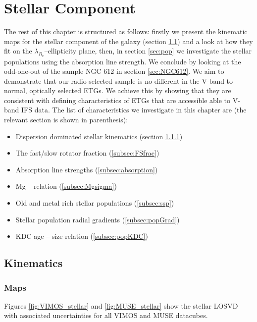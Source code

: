 \chapter{Stellar Component}
	\label{cha:stellar}


The rest of this chapter is structured as follows: firstly we present the kinematic maps for the stellar component of the galaxy (section \ref{sec:stellarKin}) and a look at how they fit on the $\lambda_{R_e}$--ellipticity plane, then, in section \ref{sec:pop} we investigate the stellar populations using the absorption line strength. We conclude by looking at the odd-one-out of the sample NGC 612 in section \ref{sec:NGC612}. We aim to demonstrate that our radio selected sample is no different in the V-band to normal, optically selected ETGs. We achieve this by showing that they are consistent with defining characteristics of ETGs that are accessible able to V-band IFS data. The list of characteristics we investigate in this chapter are (the relevant section is shown in parenthesis):
\begin{itemize}
	\item Dispersion dominated stellar kinematics (section \ref{subsec:maps})
	\item The fast/slow rotator fraction (\ref{subsec:FSfrac})
	\item Absorption line strengths (\ref{subsec:absorption})
	\item Mg -- \textsigma relation (\ref{subsec:Mgsigma})
	\item Old and metal rich stellar populations (\ref{subsec:ssp})
	\item Stellar population radial gradients (\ref{subsec:popGrad})
	\item KDC age -- size relation (\ref{subsec:popKDC})
\end{itemize}

\section{Kinematics}
	\label{sec:stellarKin}


	\subsection{Maps}
		\label{subsec:maps}


		Figures \ref{fig:VIMOS_stellar} and \ref{fig:MUSE_stellar} show the stellar LOSVD with associated uncertainties for all VIMOS and MUSE datacubes. 

